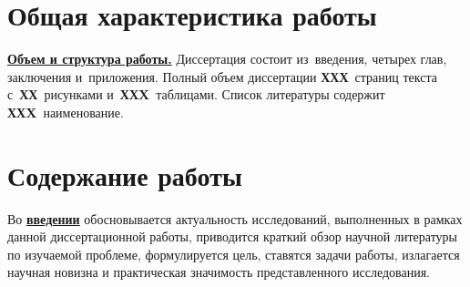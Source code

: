 
\section*{Общая характеристика работы}

\newcommand{\actuality}{\underline{\textbf{\actualityTXT}}}
\newcommand{\progress}{\underline{\textbf{\progressTXT}}}
\newcommand{\aim}{\underline{{\textbf\aimTXT}}}
\newcommand{\tasks}{\underline{\textbf{\tasksTXT}}}
\newcommand{\novelty}{\underline{\textbf{\noveltyTXT}}}
\newcommand{\influence}{\underline{\textbf{\influenceTXT}}}
\newcommand{\methods}{\underline{\textbf{\methodsTXT}}}
\newcommand{\defpositions}{\underline{\textbf{\defpositionsTXT}}}
\newcommand{\reliability}{\underline{\textbf{\reliabilityTXT}}}
\newcommand{\probation}{\underline{\textbf{\probationTXT}}}
\newcommand{\contribution}{\underline{\textbf{\contributionTXT}}}
\newcommand{\publications}{\underline{\textbf{\publicationsTXT}}}

\newcommand{\ccite}[1]{}
\newcommand{\cscite}[1]{}


\underline{\textbf{Объем и структура работы.}} Диссертация состоит из~введения, четырех глав, заключения и~приложения. Полный объем диссертации \textbf{ХХХ}~страниц текста с~\textbf{ХХ}~рисунками и~\textbf{ХХX}~таблицами. Список литературы содержит \textbf{ХХX}~наименование.

\section*{Содержание работы}
Во \underline{\textbf{введении}} обосновывается актуальность
исследований, выполненных в рамках данной диссертационной работы,
приводится краткий обзор научной литературы по изучаемой проблеме,
формулируется цель, ставятся задачи работы, излагается научная новизна
и практическая значимость представленного исследования.

